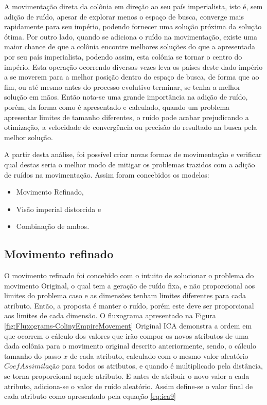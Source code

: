 A movimentação direta da colônia em direção ao seu país imperialista, isto é, sem adição de ruído, apesar de explorar menos o espaço de busca, converge mais rapidamente para seu império, podendo fornecer uma solução próxima da solução ótima. Por outro lado, quando se adiciona o ruído na movimentação, existe uma maior chance de que a colônia encontre melhores soluções do que a apresentada por seu país imperialista, podendo assim, esta colônia se tornar o centro do império. Esta operação ocorrendo diversas vezes leva os países deste dado império a se moverem para a melhor posição dentro do espaço de busca, de forma que ao fim, ou até mesmo antes do processo evolutivo terminar, se tenha a melhor solução em mãos. Então nota-se uma grande importância na adição de ruído, porém, da forma como é apresentado e calculado, quando um problema apresentar limites de tamanho diferentes, o ruído pode acabar prejudicando a otimização, a velocidade de convergência ou precisão do resultado na busca pela melhor solução.

A partir desta análise, foi possível criar novas formas de movimentação e verificar qual destas seria o melhor modo de mitigar os problemas trazidos com a adição de ruídos na movimentação. Assim foram concebidos os modelos:
\begin{itemize}
\item Movimento Refinado,
\item Visão imperial distorcida e 
\item Combinação de ambos.
\end{itemize}







\subsection{Movimento refinado}
\label{Movimento refinado}

O movimento refinado foi concebido com o intuito de solucionar o problema do movimento Original, o qual tem a geração de ruído fixa, e não proporcional aos limites do problema caso e as dimensões tenham limites diferentes para cada atributo. Então, a proposta é manter o ruído, porém este deve ser proporcional aos limites de cada dimensão. O fluxograma apresentado na Figura \ref{fig:Fluxograms-ColinyEmpireMovement} Original ICA demonstra a ordem em que ocorrem o cálculo dos valores que irão compor os novos atributos de uma dada colônia para o movimento original descrito anteriormente, sendo, o cálculo tamanho do passo \(x\) de cada atributo, calculado com o mesmo valor aleatório \(CoefAssimilação\) para todos os atributos, e quando é multiplicado pela distância, se torna proporcional aquele atributo. E antes de atribuir o novo valor a cada atributo, adiciona-se o valor de ruído aleatório. Assim define-se o valor final de cada atributo como apresentado pela equação \ref{eq:ica9}
	
